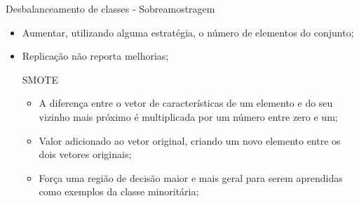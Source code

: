 \documentclass{beamer}
\begin{document}
\begin{frame}{Desbalanceamento de classes - Sobreamostragem}
    \begin{itemize}
        \item Aumentar, utilizando alguma estratégia, o número de elementos do conjunto;
        \item Replicação não reporta melhorias;
    \begin{block}{SMOTE}
    \justifying
        \begin{itemize}
            \item A diferença entre o vetor de características de um elemento e do seu vizinho mais próximo é multiplicada por um número entre zero e um;
            \item Valor adicionado ao vetor original, criando um novo elemento entre os dois vetores originais;
            \item Força uma região de decisão maior e mais geral para serem aprendidas como exemplos da classe minoritária;
        \end{itemize}
    \end{block}
    \end{itemize}







\end{frame}
\end{document}
